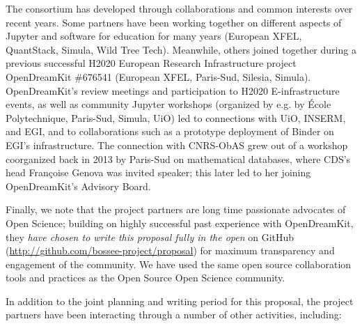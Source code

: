 The consortium has developed through collaborations and common interests over recent years.
Some partners have been working together on different aspects of Jupyter
and software for education for many years (European XFEL, QuantStack, Simula, Wild Tree Tech).
Meanwhile, others joined together during a previous successful
H2020 European Research Infrastructure project OpenDreamKit \#676541 (European XFEL,
Paris-Sud, Silesia, Simula).
OpenDreamKit's review meetings and participation to H2020
E-infrastructure events, as well as community Jupyter workshops (organized by
e.g. by \'Ecole Polytechnique, Paris-Sud, Simula, UiO) led to
connections with UiO, INSERM, and EGI, and to collaborations such as a
prototype deployment of Binder on EGI's infrastructure. The connection
with CNRS-ObAS grew out of a workshop coorganized back in 2013 by
Paris-Sud on mathematical databases, where CDS's head Françoise Genova
was invited speaker; this later led to her joining OpenDreamKit's
Advisory Board.

Finally, we note that the project partners are long time passionate
advocates of Open Science;
building on highly successful past experience with OpenDreamKit, they
\emph{have chosen to write this proposal fully in the open} on GitHub
(\href{http://github.com/bossee-project/proposal}{http://github.com/bossee-project/proposal}) for maximum transparency
and engagement of the community.
We have used the same open source collaboration tools and practices
as the Open Source Open Science community.

In addition to the joint planning and writing period for this
proposal, the project partners have been interacting through a number of
other activities, including:

